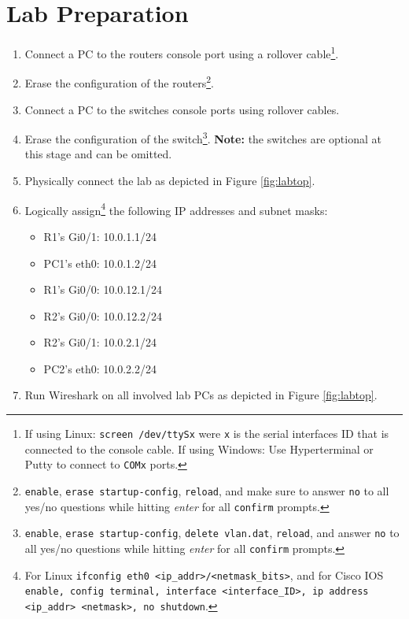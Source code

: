 \documentclass[pdftex,12pt,a4paper]{article}
\begin{document}
    \section{Lab Preparation}
        \begin{enumerate}
            \item Connect a PC to the routers console port using a rollover
                cable\footnote{If using Linux: \texttt{screen /dev/ttySx} were
                \texttt{x} is the
                serial interfaces ID that is connected to the console
                cable. If using Windows: Use Hyperterminal or Putty to
                connect to \texttt{COMx} ports.}.
            \item Erase the configuration of the
                routers\footnote{\texttt{enable}, \texttt{erase
                startup-config}, \texttt{reload}, and make sure to answer
                \texttt{no} to all yes/no questions while hitting
                \emph{enter} for all \texttt{confirm} prompts.}.
            \item Connect a PC to the switches console ports using rollover
                cables.
            \item Erase the configuration of the
                switch\footnote{\texttt{enable}, \texttt{erase startup-config},
                \texttt{delete vlan.dat}, \texttt{reload}, and answer
                \texttt{no} to all yes/no questions while hitting \emph{enter}
                for all \texttt{confirm} prompts.}. \textbf{Note:} the switches are
                optional at this stage and can be omitted.
            \item Physically connect the lab as depicted in Figure \ref{fig:labtop}.
            \item Logically assign\footnote{For Linux \texttt{ifconfig eth0
                <ip\_addr>/<netmask\_bits>}, and for Cisco IOS \texttt{enable, config terminal,
            interface <interface\_ID>, ip address <ip\_addr> <netmask>, no
    shutdown}.} the following IP addresses and subnet masks:
                \begin{itemize}
                    \item R1's Gi0/1: 10.0.1.1/24
                    \item PC1's eth0: 10.0.1.2/24
                    \item R1's Gi0/0: 10.0.12.1/24
                    \item R2's Gi0/0: 10.0.12.2/24
                    \item R2's Gi0/1: 10.0.2.1/24
                    \item PC2's eth0: 10.0.2.2/24
                \end{itemize}
            \item Run Wireshark on all involved lab PCs as depicted in Figure
                \ref{fig:labtop}.
        \end{enumerate}
\end{document}
